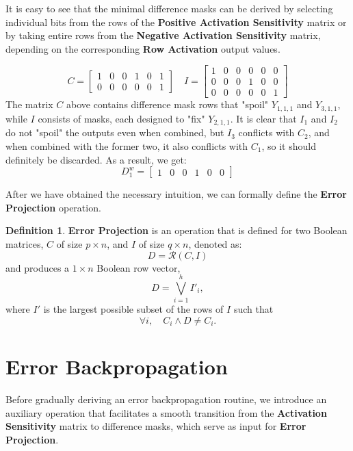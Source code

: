 \documentclass{article}
\theoremstyle{definition}
\newtheorem*{definition}{Definition}
\theoremstyle{remark}
\begin{document}
It is easy to see that the minimal difference masks can be derived by selecting individual bits from the rows of the \textbf{Positive Activation Sensitivity} matrix or by taking entire rows from the \textbf{Negative Activation Sensitivity} matrix, depending on the corresponding \textbf{Row Activation} output values.

\[
    C = \begin{bmatrix}
        1 & 0 & 0 & 1 & 0 & 1 \\
        0 & 0 & 0 & 0 & 0 & 1
    \end{bmatrix} \quad
    I = \begin{bmatrix}
        1 & 0 & 0 & 0 & 0 & 0 \\
        0 & 0 & 0 & 1 & 0 & 0 \\
        0 & 0 & 0 & 0 & 0 & 1
    \end{bmatrix}
\]
The matrix \( C \) above contains difference mask rows that "spoil" \( Y_{1,1,1} \) and \( Y_{3,1,1} \), while \( I \) consists of masks, each designed to "fix" \( Y_{2,1,1} \). It is clear that \( I_1 \) and \( I_2 \) do not "spoil" the outputs even when combined, but \( I_3 \) conflicts with \( C_2 \), and when combined with the former two, it also conflicts with \( C_1 \), so it should definitely be discarded. As a result, we get:
\[
    D^w_1 = \begin{bmatrix} 1 & 0 & 0 & 1 & 0 & 0 \end{bmatrix}
\]

After we have obtained the necessary intuition, we can formally define the \textbf{Error Projection} operation.

\begin{definition}
    \textbf{Error Projection} is an operation that is defined for two Boolean matrices, \( C \) of size \( p \times n \), and \( I \) of size \( q \times n \), denoted as:
    \[ D = \mathcal{R}(C, I) \]
    and produces a \( 1 \times n \) Boolean row vector,
    \[ D = \bigvee_{i=1}^{h} I'_{i}, \]
    where \( I' \) is the largest possible subset of the rows of \( I \) such that
    \[ \forall i, \quad C_i \wedge D \neq C_i. \]
\end{definition}

\section{Error Backpropagation}
Before gradually deriving an error backpropagation routine, we introduce an auxiliary operation that facilitates a smooth transition from the \textbf{Activation Sensitivity} matrix to difference masks, which serve as input for \textbf{Error Projection}.
\end{document}
